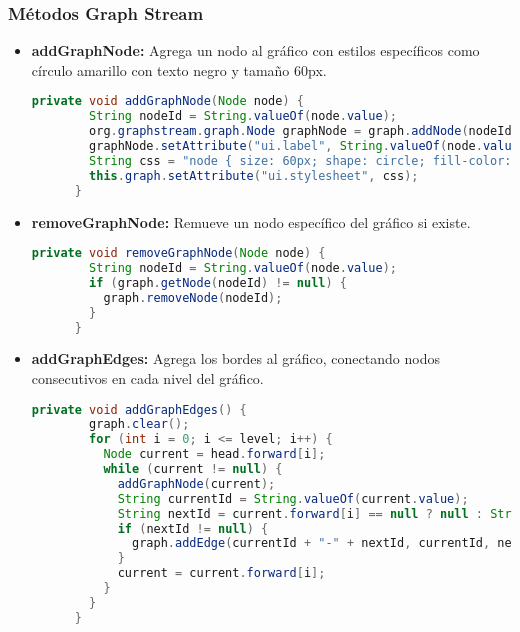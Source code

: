 \documentclass{article}
\begin{document}
  \subsubsection{Métodos Graph Stream}
  \begin{itemize}
    \item \textbf{addGraphNode: }Agrega un nodo al gráfico con estilos específicos como círculo amarillo con texto negro y tamaño 60px.
    \begin{lstlisting}[language=Java, caption={Método addGraphNode}]
      private void addGraphNode(Node node) {
        String nodeId = String.valueOf(node.value);
        org.graphstream.graph.Node graphNode = graph.addNode(nodeId);
        graphNode.setAttribute("ui.label", String.valueOf(node.value));
        String css = "node { size: 60px; shape: circle; fill-color: yellow; text-color: black; text-size: 40px; } ";
        this.graph.setAttribute("ui.stylesheet", css);
      }
    \end{lstlisting}
    \item \textbf{removeGraphNode: }Remueve un nodo específico del gráfico si existe.
    \begin{lstlisting}[language=Java, caption={Método removeGraphNode}]
      private void removeGraphNode(Node node) {
        String nodeId = String.valueOf(node.value);
        if (graph.getNode(nodeId) != null) {
          graph.removeNode(nodeId);
        }
      }
    \end{lstlisting}
    \item \textbf{addGraphEdges: }Agrega los bordes al gráfico, conectando nodos consecutivos en cada nivel del gráfico.
    \begin{lstlisting}[language=Java, caption={Método addGraphEdges}]
      private void addGraphEdges() {
        graph.clear();
        for (int i = 0; i <= level; i++) {
          Node current = head.forward[i];
          while (current != null) {
            addGraphNode(current);
            String currentId = String.valueOf(current.value);
            String nextId = current.forward[i] == null ? null : String.valueOf(current.forward[i].value);
            if (nextId != null) {
              graph.addEdge(currentId + "-" + nextId, currentId, nextId, true);
            }
            current = current.forward[i];
          }
        }
      }
    \end{lstlisting}
  \end{itemize}
  
\end{document}
